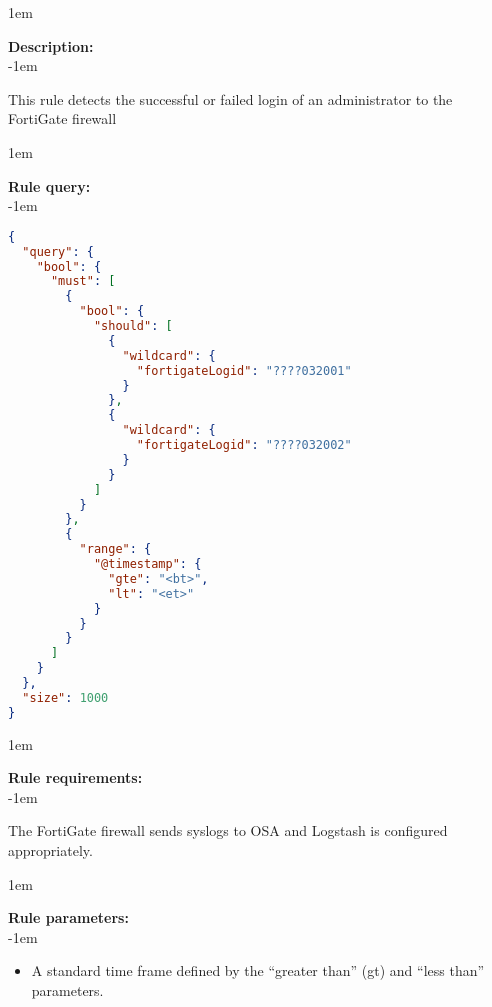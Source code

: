 \openup 1em

{\bf Description:} \\

\openup -1em
\vspace{-2em}


This rule detects the successful or failed login of an administrator to the FortiGate firewall

\openup 1em

{\bf Rule query:} \\

\openup -1em
\vspace{-2em}

\begin{lstlisting}[language=json,firstnumber=1]
{
  "query": {
    "bool": {
      "must": [
        {
          "bool": {
            "should": [
              {
                "wildcard": {
                  "fortigateLogid": "????032001"
                }
              },
              {
                "wildcard": {
                  "fortigateLogid": "????032002"
                }
              }
            ]
          }
        },
        {
          "range": {
            "@timestamp": {
              "gte": "<bt>",
              "lt": "<et>"
            }
          }
        }
      ]
    }
  },
  "size": 1000
}
\end{lstlisting}

\openup 1em

{\bf Rule requirements:} \\

\openup -1em
\vspace{-2em}

The FortiGate firewall sends syslogs to OSA and Logstash is configured appropriately.

\openup 1em

{\bf Rule parameters:} \\

\openup -1em
\vspace{-2em}

\begin{itemize}
	\item A standard time frame defined by the ``greater than'' (gt) and ``less than'' parameters.
\end{itemize}

